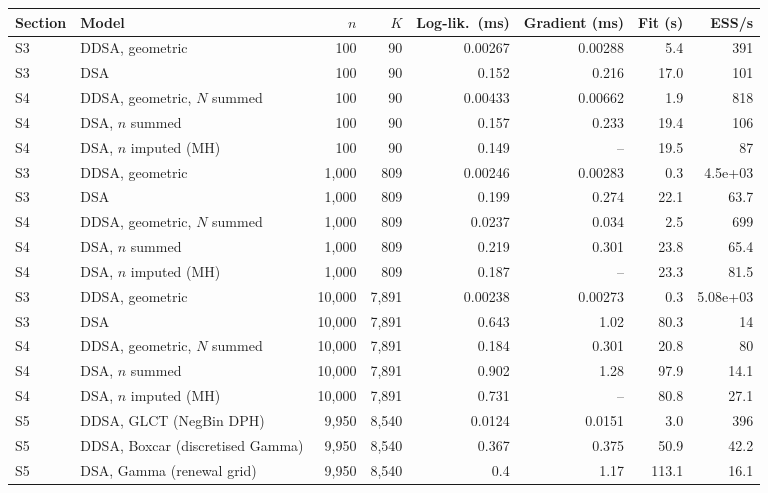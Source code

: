 \begin{tabular}{l l r r r r r r}
\toprule
Section & Model & $n$ & $K$ & Log-lik.\ (ms) & Gradient (ms) & Fit (s) & ESS/s \\
\midrule
S3 & DDSA, geometric & 100 & 90 & 0.00267 & 0.00288 & 5.4 & 391 \\
S3 & DSA & 100 & 90 & 0.152 & 0.216 & 17.0 & 101 \\
S4 & DDSA, geometric, $N$ summed & 100 & 90 & 0.00433 & 0.00662 & 1.9 & 818 \\
S4 & DSA, $n$ summed & 100 & 90 & 0.157 & 0.233 & 19.4 & 106 \\
S4 & DSA, $n$ imputed (MH) & 100 & 90 & 0.149 & -- & 19.5 & 87 \\
S3 & DDSA, geometric & 1{,}000 & 809 & 0.00246 & 0.00283 & 0.3 & 4.5e+03 \\
S3 & DSA & 1{,}000 & 809 & 0.199 & 0.274 & 22.1 & 63.7 \\
S4 & DDSA, geometric, $N$ summed & 1{,}000 & 809 & 0.0237 & 0.034 & 2.5 & 699 \\
S4 & DSA, $n$ summed & 1{,}000 & 809 & 0.219 & 0.301 & 23.8 & 65.4 \\
S4 & DSA, $n$ imputed (MH) & 1{,}000 & 809 & 0.187 & -- & 23.3 & 81.5 \\
S3 & DDSA, geometric & 10{,}000 & 7{,}891 & 0.00238 & 0.00273 & 0.3 & 5.08e+03 \\
S3 & DSA & 10{,}000 & 7{,}891 & 0.643 & 1.02 & 80.3 & 14 \\
S4 & DDSA, geometric, $N$ summed & 10{,}000 & 7{,}891 & 0.184 & 0.301 & 20.8 & 80 \\
S4 & DSA, $n$ summed & 10{,}000 & 7{,}891 & 0.902 & 1.28 & 97.9 & 14.1 \\
S4 & DSA, $n$ imputed (MH) & 10{,}000 & 7{,}891 & 0.731 & -- & 80.8 & 27.1 \\
S5 & DDSA, GLCT (NegBin DPH) & 9{,}950 & 8{,}540 & 0.0124 & 0.0151 & 3.0 & 396 \\
S5 & DDSA, Boxcar (discretised Gamma) & 9{,}950 & 8{,}540 & 0.367 & 0.375 & 50.9 & 42.2 \\
S5 & DSA, Gamma (renewal grid) & 9{,}950 & 8{,}540 & 0.4 & 1.17 & 113.1 & 16.1 \\
\bottomrule
\end{tabular}
